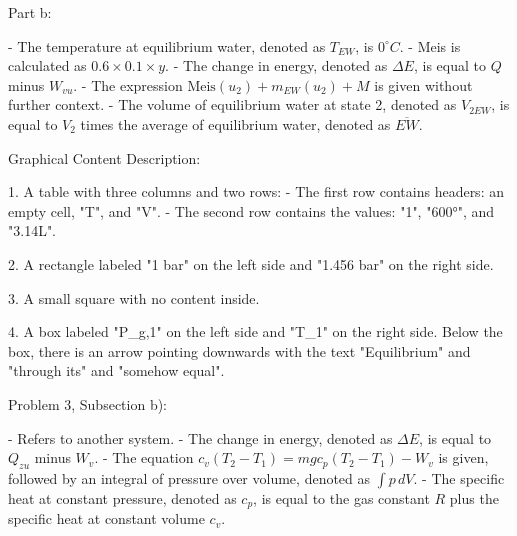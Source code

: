 Part b:

- The temperature at equilibrium water, denoted as \( T_{EW} \), is \( 0^\circ C \).
- Meis is calculated as \( 0.6 \times 0.1 \times y \).
- The change in energy, denoted as \( \Delta E \), is equal to \( Q \) minus \( W_{vu} \).
- The expression \( \text{Meis}(u_2) + m_{EW}(u_2) + M \) is given without further context.
- The volume of equilibrium water at state 2, denoted as \( V_{2EW} \), is equal to \( V_{2} \) times the average of equilibrium water, denoted as \( \overline{EW} \).

Graphical Content Description:

1. A table with three columns and two rows:
   - The first row contains headers: an empty cell, "T", and "V".
   - The second row contains the values: "1", "600°", and "3.14L".

2. A rectangle labeled "1 bar" on the left side and "1.456 bar" on the right side.

3. A small square with no content inside.

4. A box labeled "P_{g,1}" on the left side and "T_{1}" on the right side. Below the box, there is an arrow pointing downwards with the text "Equilibrium" and "through its" and "somehow equal".

Problem 3, Subsection b):

- Refers to another system.
- The change in energy, denoted as \( \Delta E \), is equal to \( Q_{zu} \) minus \( W_v \).
- The equation \( c_v (T_2 - T_1) = m g c_p (T_2 - T_1) - W_v \) is given, followed by an integral of pressure over volume, denoted as \( \int p \, dV \).
- The specific heat at constant pressure, denoted as \( c_p \), is equal to the gas constant \( R \) plus the specific heat at constant volume \( c_v \).